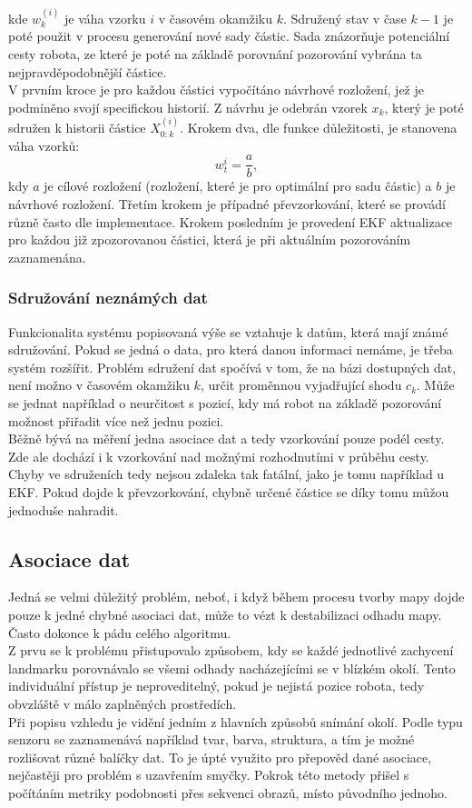 \documentclass[11pt]{article}
\begin{document}
kde $w^{(i)}_{k}$ je váha vzorku $i$ v časovém okamžiku $k$. Sdružený stav v čase $k-1$ je poté použit v procesu generování nové sady částic. Sada znázorňuje potenciální cesty robota, ze které je poté na základě porovnání pozorování vybrána ta nejpravděpodobnější částice.\\
\indent V prvním kroce je pro každou částici vypočítáno návrhové rozložení, jež je podmíněno svojí specifickou historií. Z návrhu je odebrán vzorek $x_k$, který je poté sdružen k historii částice $X^{(i)}_{0:k}$. Krokem dva, dle funkce důležitosti, je stanovena váha vzorků:
\begin{equation}
	w_t^i=\frac{a}{b},
\end{equation}
kdy $a$ je cílové rozložení (rozložení, které je pro optimální pro sadu částic) a $b$ je návrhové rozložení. Třetím krokem je případné převzorkování, které se provádí různě často dle implementace. Krokem posledním je provedení EKF aktualizace pro každou již zpozorovanou částici, která je při aktuálním pozorováním zaznamenána. \\

\subsubsection{Sdružování neznámých dat}
Funkcionalita systému popisovaná výše se vztahuje k datům, která mají známé sdružování. Pokud se jedná o data, pro která danou informaci nemáme, je třeba systém rozšířit. Problém sdružení dat spočívá v tom, že na bázi dostupných dat, není možno v časovém okamžiku $k$, určit proměnnou vyjadřující shodu $c_k$. Může se jednat například o neurčitost s pozicí, kdy má robot na základě pozorování možnost přiřadit více než jednu pozici.\\
\indent Běžně bývá na měření jedna asociace dat a tedy vzorkování pouze podél cesty. Zde ale dochází i k vzorkování nad možnými rozhodnutími v průběhu cesty. Chyby ve sdruženích tedy nejsou zdaleka tak fatální, jako je tomu například u EKF. Pokud dojde k převzorkování, chybně určené částice se díky tomu můžou jednoduše nahradit.

\newpage
\subsection{Asociace dat}
Jedná se velmi důležitý problém, neboť, i když během procesu tvorby mapy dojde pouze k jedné chybné asociaci dat, může to vézt k destabilizaci odhadu mapy. Často dokonce k pádu celého algoritmu.\\
\indent Z prvu se k problému přistupovalo způsobem, kdy se každé jednotlivé zachycení landmarku porovnávalo se všemi odhady nacházejícími se v blízkém okolí. Tento individuální přístup je neproveditelný, pokud je nejistá pozice robota, tedy obvzláště v málo zaplněných prostředích. \\
\indent Při popisu vzhledu je vidění jedním z hlavních způsobů snímání okolí. Podle typu senzoru se zaznamenává například tvar, barva, struktura, a tím je možné rozlišovat různé balíčky dat. To je úpté využito pro přepověd dané asociace, nejčastěji pro problém s uzavřením smyčky. Pokrok této metody přišel s počítáním metriky podobnosti přes sekvenci obrazů, místo původního jednoho. 
\end{document}
